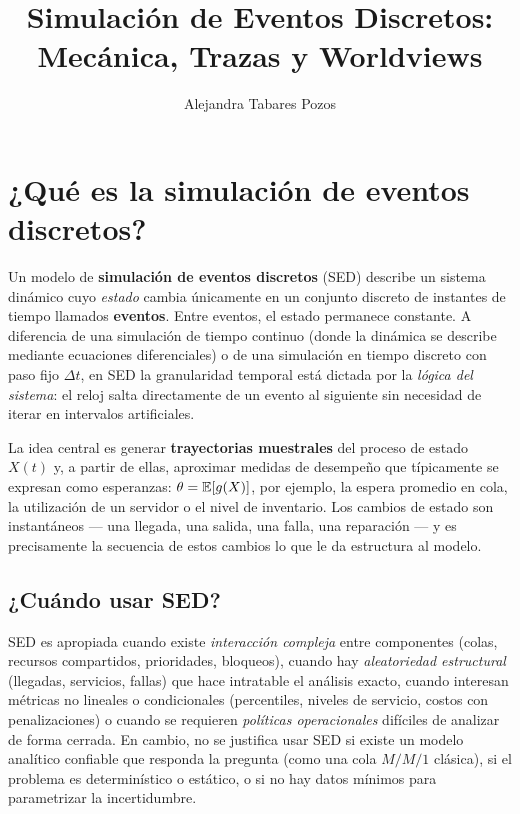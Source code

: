 \documentclass[11pt, letterpaper]{article}
\title{Simulación de Eventos Discretos: Mecánica, Trazas y Worldviews}
\author{Alejandra Tabares Pozos}
\date{}
\begin{document}

\maketitle
\tableofcontents
\newpage

\section{¿Qué es la simulación de eventos discretos?}

Un modelo de \textbf{simulación de eventos discretos} (SED) describe un sistema dinámico cuyo \emph{estado} cambia únicamente en un conjunto discreto de instantes de tiempo llamados \textbf{eventos}. Entre eventos, el estado permanece constante. A diferencia de una simulación de tiempo continuo (donde la dinámica se describe mediante ecuaciones diferenciales) o de una simulación en tiempo discreto con paso fijo $\Delta t$, en SED la granularidad temporal está dictada por la \emph{lógica del sistema}: el reloj salta directamente de un evento al siguiente sin necesidad de iterar en intervalos artificiales.

La idea central es generar \textbf{trayectorias muestrales} del proceso de estado $X(t)$ y, a partir de ellas, aproximar medidas de desempeño que típicamente se expresan como esperanzas: $\theta = \mathbb{E}[g(X)]$, por ejemplo, la espera promedio en cola, la utilización de un servidor o el nivel de inventario. Los cambios de estado son instantáneos --- una llegada, una salida, una falla, una reparación --- y es precisamente la secuencia de estos cambios lo que le da estructura al modelo.

\subsection{¿Cuándo usar SED?}

SED es apropiada cuando existe \emph{interacción compleja} entre componentes (colas, recursos compartidos, prioridades, bloqueos), cuando hay \emph{aleatoriedad estructural} (llegadas, servicios, fallas) que hace intratable el análisis exacto, cuando interesan métricas no lineales o condicionales (percentiles, niveles de servicio, costos con penalizaciones) o cuando se requieren \emph{políticas operacionales} difíciles de analizar de forma cerrada. En cambio, no se justifica usar SED si existe un modelo analítico confiable que responda la pregunta (como una cola $M/M/1$ clásica), si el problema es determinístico o estático, o si no hay datos mínimos para parametrizar la incertidumbre.
\end{document}
